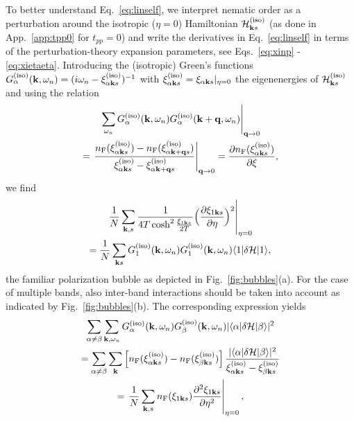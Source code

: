 \documentclass[prb, twocolumn,showpacs,preprintnumbers,amsmath,amssymb, floatfix]{revtex4}
\begin{document}
To better understand Eq.~\eqref{eq:linself}, we interpret nematic order as a perturbation around the isotropic ($\eta=0$) Hamiltonian $\mathcal{H}_{{\bf k} s}^{({\rm iso})}$ (as done in App.~\ref{app:tpp0} for $t_{pp}=0$) and write the derivatives in Eq.~\eqref{eq:linself} in terms of the perturbation-theory expansion parameters, see Eqs.~\eqref{eq:xinp} - \eqref{eq:xietaeta}. Introducing the (isotropic) Green's functions $G_{\alpha}^{({\rm iso})}({\bf k}, \omega_n) = (i\omega_n - \xi^{({\rm iso})}_{\alpha {\bf k} s})^{-1}$ with $\xi^{({\rm iso})}_{\alpha {\bf k} s} = \xi_{\alpha {\bf k} s}|_{\eta=0}$ the eigenenergies of $\mathcal{H}_{{\bf k} s}^{({\rm iso})}$ and using the relation
\begin{multline}
  \left.\sum_{\omega_{n}}G^{({\rm iso})}_{\alpha}({\bf k}, \omega_n)G^{({\rm iso})}_{\alpha}({\bf k} + {\bf q}, \omega_n)\right|_{{\bf q} \rightarrow 0}\\
  =\left. \frac{n_{\rm F}(\xi^{({\rm iso})}_{\alpha{\bf k} s}) - n_{\rm F}(\xi^{({\rm iso})}_{\alpha{\bf k}+{\bf q} s})}{\xi^{({\rm iso})}_{\alpha{\bf k} s} - \xi^{({\rm iso})}_{\alpha{\bf k} + {\bf q} s}}\right|_{{\bf q} \rightarrow 0} = \frac{\partial n_{\rm F}(\xi^{({\rm iso})}_{\alpha {\bf k} s})}{\partial \xi},
 \label{eq:Gsums}
\end{multline}
we find
\begin{multline}
  \left.\frac{1}{N}\sum_{{\bf k}, s}\frac{1}{4T\cosh^2\frac{\xi_{1{\bf k} s}}{2T}}\Big(\frac{\partial\xi_{1 {\bf k} s}}{\partial \eta}\Big)^2\right|_{\eta = 0}\\
  = \frac{1}{N}\sum_{{\bf k} s} G^{({\rm iso})}_{1}({\bf k}, \omega_n)G^{({\rm iso})}_{1}({\bf k}, \omega_n)\langle1|\delta \mathcal{H}|1\rangle,
 \label{eq:firstterm}
\end{multline}
the familiar polarization bubble as depicted in Fig.~\ref{fig:bubbles}(a). For the case of multiple bands, also inter-band interactions should be taken into account as indicated by Fig.~\ref{fig:bubbles}(b). The corresponding expression yields
\begin{multline}
  \sum_{\alpha\neq\beta}\sum_{{\bf k},\omega_n}G^{({\rm iso})}_{\alpha}({\bf k}, \omega_n)G^{({\rm iso})}_{\beta}({\bf k}, \omega_n)|\langle\alpha|\delta\mathcal{H}|\beta\rangle|^2\\
  = \sum_{\alpha\neq\beta}\sum_{{\bf k}}\left[n_{\rm F}(\xi^{({\rm iso})}_{\alpha{\bf k} s}) - n_{\rm F}(\xi^{({\rm iso})}_{\beta{\bf k} s})\right]\frac{|\langle\alpha|\delta\mathcal{H}|\beta\rangle|^2}{\xi^{({\rm iso})}_{\alpha{\bf k} s} - \xi^{({\rm iso})}_{\beta{\bf k} s}}\\
  = \left.\frac{1}{N}\sum_{{\bf k}, s} n_{\rm F}(\xi_{1{\bf k} s})\frac{\partial^2\xi_{1 {\bf k} s}}{\partial \eta^2}\right|_{\eta = 0},
 \label{eq:sum2}
\end{multline}
\end{document}
